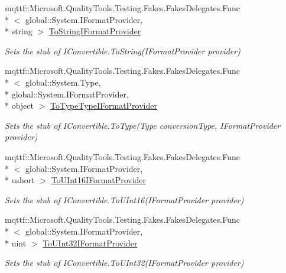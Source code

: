 \begin{DoxyCompactItemize}
mqttf\-::\-Microsoft.\-Quality\-Tools.\-Testing.\-Fakes.\-Fakes\-Delegates.\-Func\\*
$<$ global\-::\-System.\-I\-Format\-Provider, \\*
string $>$ \hyperlink{class_system_1_1_fakes_1_1_stub_i_convertible_a37269ecefae1604359d7c41f36041b15}{To\-String\-I\-Format\-Provider}
\begin{DoxyCompactList}\small\item\em Sets the stub of I\-Convertible.\-To\-String(\-I\-Format\-Provider provider)\end{DoxyCompactList}\item 
mqttf\-::\-Microsoft.\-Quality\-Tools.\-Testing.\-Fakes.\-Fakes\-Delegates.\-Func\\*
$<$ global\-::\-System.\-Type, \\*
global\-::\-System.\-I\-Format\-Provider, \\*
object $>$ \hyperlink{class_system_1_1_fakes_1_1_stub_i_convertible_a442dca9a881e39666e27f6a073422e64}{To\-Type\-Type\-I\-Format\-Provider}
\begin{DoxyCompactList}\small\item\em Sets the stub of I\-Convertible.\-To\-Type(\-Type conversion\-Type, I\-Format\-Provider provider)\end{DoxyCompactList}\item 
mqttf\-::\-Microsoft.\-Quality\-Tools.\-Testing.\-Fakes.\-Fakes\-Delegates.\-Func\\*
$<$ global\-::\-System.\-I\-Format\-Provider, \\*
ushort $>$ \hyperlink{class_system_1_1_fakes_1_1_stub_i_convertible_a734392d60fc71f14fcc20e4a3c9e9be7}{To\-U\-Int16\-I\-Format\-Provider}
\begin{DoxyCompactList}\small\item\em Sets the stub of I\-Convertible.\-To\-U\-Int16(\-I\-Format\-Provider provider)\end{DoxyCompactList}\item 
mqttf\-::\-Microsoft.\-Quality\-Tools.\-Testing.\-Fakes.\-Fakes\-Delegates.\-Func\\*
$<$ global\-::\-System.\-I\-Format\-Provider, \\*
uint $>$ \hyperlink{class_system_1_1_fakes_1_1_stub_i_convertible_a6034310c9c61c066262fd366c0e00545}{To\-U\-Int32\-I\-Format\-Provider}
\begin{DoxyCompactList}\small\item\em Sets the stub of I\-Convertible.\-To\-U\-Int32(\-I\-Format\-Provider provider)\end{DoxyCompactList}\item 

\end{DoxyCompactItemize}
